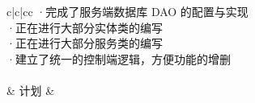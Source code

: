 \documentclass{article}
\begin{document}
\begin{table}[htbp]
\begin{tabular}{c|c|cc}
{{        ·完成了服务端数据库 DAO 的配置与实现                                                                                                               \\
        ·正在进行大部分实体类的编写                                                                                                                        \\
        ·正在进行大部分服务类的编写                                                                                                                        \\
        ·建立了统一的控制端逻辑，方便功能的增删                                                                                                            \\
        }}                                                                                                                                                 \\
                                               & 计划                     &                                                                                                                                                  \\
        \hline
    \end{tabular}%
\end{table}%
\end{document}
